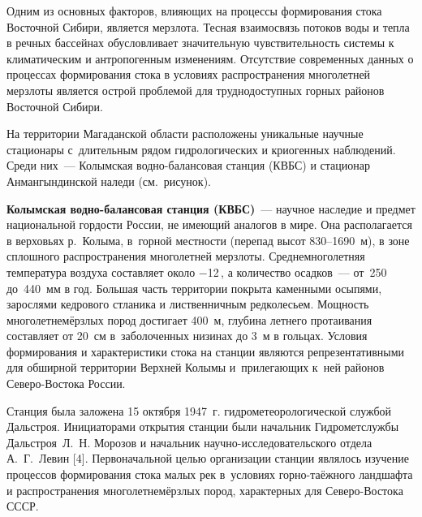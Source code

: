  

\makeProcTitle
{}

Одним из основных факторов, влияющих на процессы формирования стока Восточной Сибири, является мерзлота. Тесная взаимосвязь потоков воды и тепла в речных бассейнах обусловливает значительную чувствительность системы к климатическим и антропогенным изменениям. Отсутствие современных данных о процессах формирования стока в условиях распространения многолетней мерзлоты является острой проблемой для труднодоступных горных районов Восточной Сибири.

На территории Магаданской области расположены уникальные научные стационары с~длительным рядом гидрологических и криогенных наблюдений. Среди них~--- Колымская водно-балансовая станция (КВБС) и стационар Анмангындинской наледи (см.~рисунок).



\textbf{Колымская водно-балансовая станция (КВБС)}~--- научное наследие и предмет национальной гордости России, не имеющий аналогов в мире. Она располагается в верховьях р.~Колыма, в~горной местности (перепад высот 830--1690~м), в зоне сплошного распространения многолетней мерзлоты. Среднемноголетняя температура воздуха составляет около $-$12\,, а количество осадков~--- от~250 до~440~мм в год. Большая часть территории покрыта каменными осыпями, зарослями кедрового стланика и лиственничным редколесьем. Мощность многолетнемёрзлых пород достигает 400~м, глубина летнего протаивания составляет от 20~см в~заболоченных низинах до 3~м в гольцах. Условия формирования и характеристики стока на станции являются репрезентативными для обширной территории Верхней Колымы и~прилегающих к~ней районов Северо-Востока России.

Станция была заложена 15 октября 1947~г. гидрометеорологической службой Дальстроя. Инициаторами открытия станции были начальник Гидрометслужбы Дальстроя~Л.~Н. Морозов и начальник научно-ис\-сле\-до\-ва\-тель\-ско\-го отдела А.~Г.~Левин [4]. Первоначальной целью организации станции являлось изучение процессов формирования стока малых рек в~условиях горно-таёжного ландшафта и распространения многолетнемёрзлых пород, характерных для Северо-Востока СССР.

